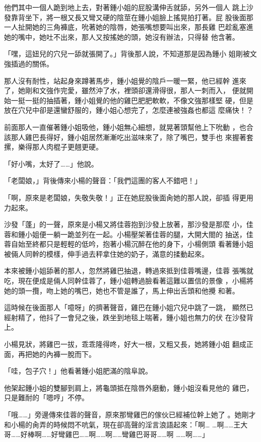他們其中一個人跪到地上去，對著鍾小姐的屁股溝伸舌就舔，另外一個人
跳上沙發靠背坐下，將一根又長又彎又硬的陰莖在鍾小姐臉上搖晃拍打著。屁
股後面那一人扯開她的三角褲底，吮著她的陰唇，她張嘴想要叫出來，那長雞
巴趁亂塞進她的嘴中，她吐不出來，那人又按搖她的頭，她沒有辦法，只得替
他含著。

「嘿，這妞兒的穴兒一舔就張開了。」背後那人說，不知道那是因為鍾小
姐剛被文強插過的關係。

那人沒有耐性，站起身來蹲著馬步，鍾小姐覺的陰戶一暖一緊，他已經幹
進來了，她剛和文強作完愛，雖然沖了水，裡頭卻還滑得很，那人一刺而入，
便就開始一挺一挺的抽插著，鍾小姐覺的他的雞巴肥肥軟軟，不像文強那樣堅
硬，但是放在穴兒中卻是還蠻舒服的，鍾小姐心想完了，怎麼連被強姦也都這
麼痛快！？

前面那人一直催著鍾小姐吸他，鍾小姐無心細想，就晃著頭幫他上下吮動
，也合該那人雞巴長得好，鍾小姐居然漸漸吃出滋味來了，除了嘴巴，雙手也
來握著套摞，樂得那人肉棍子更翹更硬。

「好小嘴，太好了……」他說。

「老闆娘，」背後傳來小楊的聲音：「我們這團的客人不錯吧！」

「啊，原來是老闆娘，失敬失敬！」正在她屁股後面肏她的那人說，卻插
得更用力起來。

沙發「蓬」的一聲，原來是小楊又將佳蓉抱到沙發上放著，那沙發是那麼
小，佳蓉和鍾小姐便一躺一跪並列在一起。小楊壓架著佳蓉的腿，大開大閤的
抽送，佳蓉自始至終都只是輕輕的低吟，抱著小楊沉醉在他的身下，小楊側頭
看著鍾小姐被倆人同幹的模樣，伸手過去秤拿住她的奶子，滿意的揉動起來。

本來被鍾小姐舔著的那人，忽然將雞巴抽退，轉過來抵到佳蓉嘴邊，佳蓉
張嘴就吃，現在便成是倆人同幹佳蓉了，鍾小姐轉過臉看著這難以置信的景像
，小楊將她的頭一攬，吻上她的嘴巴，她也不管是誰了，馬上伸出舌頭和他攪
和著。

這時候在後面那人「噫呀」的擠著聲音，雞巴在鍾小姐穴兒中跳了一跳，
顯然已經射精了，他抖了一會兒之後，跌坐到地毯上喘著，鍾小姐也無力的伏
在沙發背上。

小楊見狀，將雞巴一拔，乖乖隆得咚，好大一根，又粗又長，她將鍾小姐
翻成正面，再把她的內褲一脫而下。

「哇，包子穴！」他看著鍾小姐肥滿的陰阜說。

他架起鍾小姐的雙腳到肩上，將龜頭抵在陰唇外磨動，鍾小姐沒看見他的
雞巴，只是難耐的「嗯哼」不停。

「哦……」旁邊傳來佳蓉的聲音，原來那彎雞巴的傢伙已經補位幹上她了
。她剛才和小楊的肏弄的時候悶不吭氣，現在卻高聲的淫言浪語起來：「啊…
…啊……王大哥……好棒啊……好彎雞巴……啊……啊……彎雞巴哥哥……啊
……啊……」

